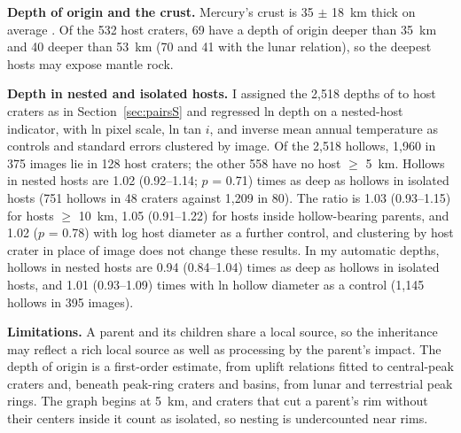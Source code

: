 \documentclass{planetary}
\begin{document}
\textbf{Depth of origin and the crust.} Mercury's crust is 35 $\pm$ 18~km thick on average \parencite{padovan2015}. Of the 532 host craters, 69 have a depth of origin deeper than 35~km and 40 deeper than 53~km (70 and 41 with the lunar relation), so the deepest hosts may expose mantle rock.

\textbf{Depth in nested and isolated hosts.} I assigned the 2,518 depths of \textcite{blewett2016} to host craters as in Section~\ref{sec:pairsS} and regressed ln depth on a nested-host indicator, with ln pixel scale, ln tan $i$, and inverse mean annual temperature as controls and standard errors clustered by image. Of the 2,518 hollows, 1,960 in 375 images lie in 128 host craters; the other 558 have no host $\geq$ 5~km. Hollows in nested hosts are 1.02 (0.92--1.14; $p$ = 0.71) times as deep as hollows in isolated hosts (751 hollows in 48 craters against 1,209 in 80). The ratio is 1.03 (0.93--1.15) for hosts $\geq$ 10~km, 1.05 (0.91--1.22) for hosts inside hollow-bearing parents, and 1.02 ($p$ = 0.78) with log host diameter as a further control, and clustering by host crater in place of image does not change these results. In my automatic depths, hollows in nested hosts are 0.94 (0.84--1.04) times as deep as hollows in isolated hosts, and 1.01 (0.93--1.09) times with ln hollow diameter as a control (1,145 hollows in 395 images).

\textbf{Limitations.} A parent and its children share a local source, so the inheritance may reflect a rich local source as well as processing by the parent's impact. The depth of origin is a first-order estimate, from uplift relations fitted to central-peak craters and, beneath peak-ring craters and basins, from lunar and terrestrial peak rings. The graph begins at 5~km, and craters that cut a parent's rim without their centers inside it count as isolated, so nesting is undercounted near rims.
\end{document}
